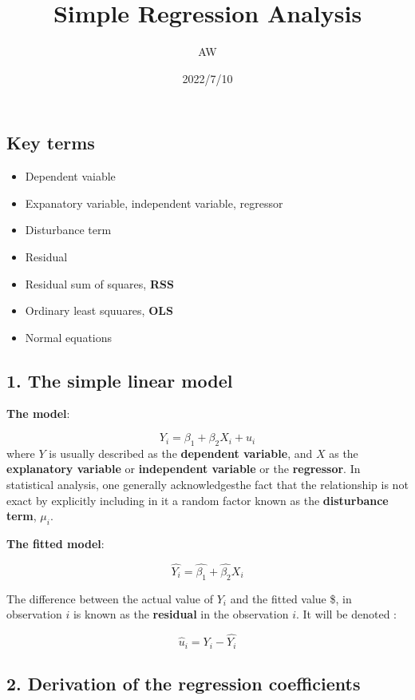 \documentclass[
]{article}
\title{Simple Regression Analysis}
\author{AW}
\date{2022/7/10}
\providecommand{\tightlist}{%
  \setlength{\itemsep}{0pt}\setlength{\parskip}{0pt}}
\begin{document}
\maketitle

\hypertarget{key-terms}{%
\subsection{Key terms}\label{key-terms}}

\begin{itemize}
\tightlist
\item
  Dependent vaiable
\item
  Expanatory variable, independent variable, regressor
\item
  Disturbance term
\item
  Residual
\item
  Residual sum of squares, \textbf{RSS}
\item
  Ordinary least squuares, \textbf{OLS}
\item
  Normal equations
\end{itemize}

\hypertarget{the-simple-linear-model}{%
\subsection{1. The simple linear model}\label{the-simple-linear-model}}

\textbf{The model}:

\[Y_{i}=\beta_{1}+\beta_{2}X_{i}+u_{i}\] where \(Y\) is usually
described as the \textbf{dependent variable}, and \(X\) as the
\textbf{explanatory variable} or \textbf{independent variable} or the
\textbf{regressor}. In statistical analysis, one generally
acknowledgesthe fact that the relationship is not exact by explicitly
including in it a random factor known as the \textbf{disturbance term},
\(\mu_{i}\).

\textbf{The fitted model}:

\[\hat{Y_{i}}=\hat{\beta_{1}}+\hat{\beta_{2}}X_{i}\]

The difference between the actual value of \(Y_{i}\) and the fitted
value \$, in observation \(i\) is known as the
\textbf{residual} in the observation \(i\). It will be denoted
:

\[\hat{u}_{i}=Y_{i}-\hat{Y_{i}}\]

\hypertarget{derivation-of-the-regression-coefficients}{%
\subsection{2. Derivation of the regression
coefficients}\label{derivation-of-the-regression-coefficients}}
\end{document}
